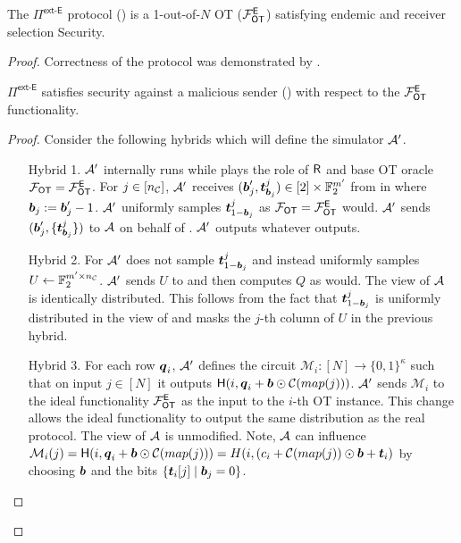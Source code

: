 \begin{lemma}\label{lem:ext-E}
	The $\Pi^{\textsf{ext-E}}$ protocol () is a 1-out-of-$N$ OT ($\mathcal{F}_{\mathsf{OT}}^\mathsf{E}$) satisfying endemic and receiver selection Security.
\end{lemma}
\begin{proof}
	Correctness of the protocol was demonstrated by \cite{RSA:OrrOrsSch17}.%
	\begin{claim}\label{claim:ext-E-MalSender}

		$\Pi^\textsf{ext-E}$ satisfies security against a malicious sender () with respect to the $\mathcal{F}_{\mathsf{OT}}^\mathsf{E}$ functionality.

	\end{claim}
	\begin{proof}
		Consider the following hybrids which will define the simulator $\mathcal{A}'$. 
		\begin{enumerate}[leftmargin=0.6cm,itemindent=30pt]
			\item[Hybrid 1.] $\mathcal{A}'$ internally runs \Adv while plays the role of $\mathsf{R}$ and base OT oracle $\mathcal{F}_{\mathsf{OT}}=\mathcal{F}_{\mathsf{OT}}^\mathsf{E}$. For $j\in[{n_\mathcal{C}}]$, $\mathcal{A}'$ receives $(\boldsymbol{b}'_j,\boldsymbol{t}^j_{\boldsymbol{b}_j})\in [2]\times \mathbb{F}^{m'}_2$ from \Adv in  where $\boldsymbol{b}_j:=\boldsymbol{b}_j'-1$. $\mathcal{A}'$ uniformly samples $\boldsymbol{t}^j_{1-\boldsymbol{b}_j}$ as $\mathcal{F}_{\mathsf{OT}}=\mathcal{F}_{\mathsf{OT}}^\mathsf{E}$ would. $\mathcal{A}'$ sends $(\boldsymbol{b}_j', \{\boldsymbol{t}^j_{\boldsymbol{b}_j}\})$ to $\mathcal{A}$ on behalf of \OOT. $\mathcal{A}'$ outputs whatever \Adv outputs. 
			
			\item[Hybrid 2.] For  $\mathcal{A}'$ does not sample $\boldsymbol{t}^j_{1-\boldsymbol{b}_j}$ and instead uniformly samples $U\gets\mathbb{F}^{m'\times {n_\mathcal{C}}}_2$. $\mathcal{A}'$ sends $U$ to \Adv and then computes $Q$ as \send would. The view of $\mathcal{A}$ is identically distributed.
			\iffullversion
			 This follows from the fact that $\boldsymbol{t}^j_{1-\boldsymbol{b}_j}$ is uniformly distributed in the view of \Adv and masks the $j$-th column of $U$ in the previous hybrid. 
			\fi
			
			\item[Hybrid 3.]\label{hybrid:malSendExtract} For each row $\boldsymbol{q}_i$, $\mathcal{A}'$ defines the circuit $\mathcal{M}_i:[N]\rightarrow\{0,1\}^\kappa$ such that on input $j\in[N]$ it outputs $\mathsf{H}(i, \boldsymbol{q}_i+\boldsymbol{b}\odot \mathcal{C}(map(j)))$. $\mathcal{A}'$ sends $\mathcal{M}_i$ to the ideal functionality $\mathcal{F}_{\mathsf{OT}}^\mathsf{E}$ as the input to the $i$-th OT instance. 
			\iffullversion
			This change allows the ideal functionality to output the same distribution as the real protocol. The view of $\mathcal{A}$ is unmodified. Note, $\mathcal{A}$ can influence $\mathcal{M}_i(j)=\mathsf{H}(i, \boldsymbol{q}_i+\boldsymbol{b}\odot \mathcal{C}(map(j)))=H(i, (c_i + \mathcal{C}(map(j)) \odot \boldsymbol{b} + \boldsymbol{t}_i)$ by choosing $\boldsymbol{b}$ and the bits $\{\boldsymbol{t}_i[j] \mid \boldsymbol{b}_j=0\}$.
			\fi
			

\end{enumerate}
\end{proof}
\end{proof}
